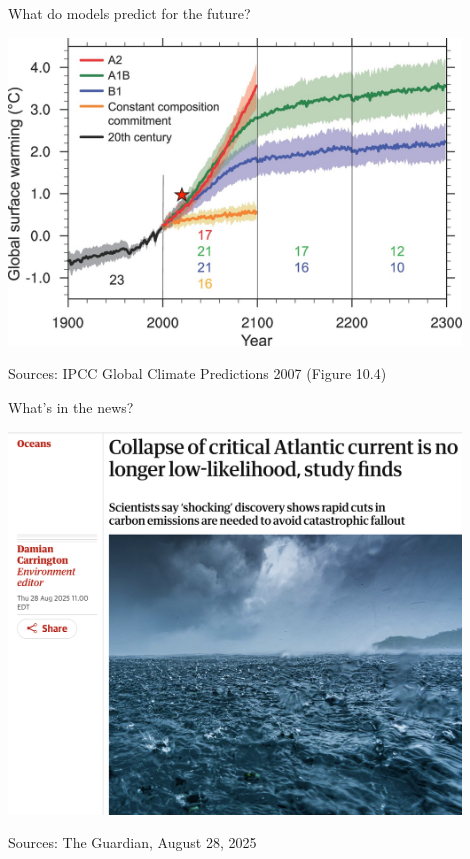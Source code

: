\documentclass[12pt]{beamer}
\begin{document}
\begin{frame}{What do models predict for the future?}

\begin{center}
\includegraphics[width=0.9\textwidth]{images/ipcc-models-2007_fig-10-04-1_w-star.jpg}
\end{center}
%


\vfill
{\tiny Sources: IPCC Global Climate Predictions 2007 (Figure 10.4)}
\end{frame}
\begin{frame}{What's in the news?}

\begin{center}
\includegraphics[width=0.9\textwidth]{images/guardian_2025-08-28_headline.png}
\end{center}
%


\vfill
{\tiny Sources: The Guardian, August 28, 2025}
\end{frame}
\end{document}
